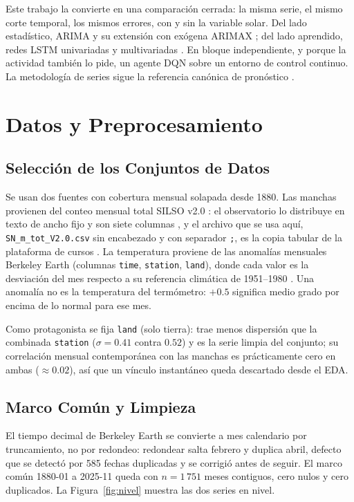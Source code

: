 \documentclass[10pt,journal]{IEEEtran}
\begin{document}
  Este trabajo la convierte en una comparaci\'on cerrada: la misma serie, el mismo corte temporal, los mismos errores, con y sin la variable solar. Del lado estad\'istico, ARIMA y su extensi\'on con ex\'ogena ARIMAX \cite{box2015}; del lado aprendido, redes LSTM univariadas y multivariadas \cite{hochreiter1997,lim2021}. En bloque independiente, y porque la actividad tambi\'en lo pide, un agente DQN \cite{mnih2015} sobre un entorno de control continuo. La metodolog\'ia de series sigue la referencia can\'onica de pron\'ostico \cite{hyndman2021}.

  \section{Datos y Preprocesamiento}

  \subsection{Selecci\'on de los Conjuntos de Datos}

  Se usan dos fuentes con cobertura mensual solapada desde 1880. Las manchas provienen del conteo mensual total SILSO v2.0 \cite{silso2025}: el observatorio lo distribuye en texto de ancho fijo y son siete columnas \cite{silso2025}, y el archivo que se usa aqu\'i, \texttt{SN\_m\_tot\_V2.0.csv} sin encabezado y con separador \texttt{;}, es la copia tabular de la plataforma de cursos \cite{kaggle_sunspot_dataset}. La temperatura proviene de las anomal\'ias mensuales Berkeley Earth (columnas \texttt{time}, \texttt{station}, \texttt{land}), donde cada valor es la desviaci\'on del mes respecto a su referencia clim\'atica de 1951--1980 \cite{berkeleyearth2024,rohde2020,kaggle_land_temperature_dataset}. Una anomal\'ia no es la temperatura del term\'ometro: $+0.5$ significa medio grado por encima de lo normal para ese mes.

  Como protagonista se fija \texttt{land} (solo tierra): trae menos dispersi\'on que la combinada \texttt{station} ($\sigma=0.41$ contra $0.52$) y es la serie limpia del conjunto; su correlaci\'on mensual contempor\'anea con las manchas es pr\'acticamente cero en ambas ($\approx 0.02$), as\'i que un v\'inculo instant\'aneo queda descartado desde el EDA.

  \subsection{Marco Com\'un y Limpieza}

  El tiempo decimal de Berkeley Earth se convierte a mes calendario por truncamiento, no por redondeo: redondear salta febrero y duplica abril, defecto que se detect\'o por 585 fechas duplicadas y se corrigi\'o antes de seguir. El marco com\'un 1880-01 a 2025-11 queda con $n=1\,751$ meses contiguos, cero nulos y cero duplicados. La Figura~\ref{fig:nivel} muestra las dos series en nivel.
\end{document}

